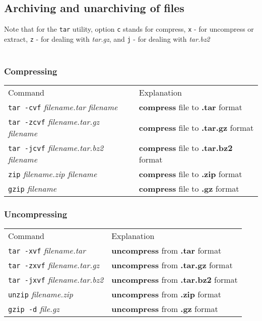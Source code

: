 \subsection{Archiving and unarchiving of files}
Note that for the \texttt{tar} utility, option \texttt{c} stands for compress, 
\texttt{x} - for uncompress or extract, \texttt{z} - for dealing with \textit{tar.gz},
and \texttt{j} - for dealing with \textit{tar.bz2}\\~\\
\subsubsection{Compressing}
\begin{tabular}{ll}
  Command & Explanation \\
  \hhline{==}
  \texttt{tar -cvf} \textit{filename.tar} \textit{filename} & \textbf{compress} file to \textbf{.tar} format \\
  \texttt{tar -zcvf} \textit{filename.tar.gz} \textit{filename} & \textbf{compress} file to \textbf{.tar.gz} format \\
  \texttt{tar -jcvf} \textit{filename.tar.bz2} \textit{filename} & \textbf{compress} file to \textbf{.tar.bz2} format \\
  \texttt{zip} \textit{filename.zip filename} & \textbf{compress} file to \textbf{.zip} format \\
  \texttt{gzip} \textit{filename} & \textbf{compress} file to \textbf{.gz} format \\
\end{tabular}

\subsubsection{Uncompressing}
\begin{tabular}{ll}
  Command & Explanation \\
  \hhline{==}
  \texttt{tar -xvf} \textit{filename.tar} & \textbf{uncompress} from \textbf{.tar} format \\
  \texttt{tar -zxvf} \textit{filename.tar.gz} & \textbf{uncompress} from \textbf{.tar.gz} format \\
  \texttt{tar -jxvf} \textit{filename.tar.bz2} & \textbf{uncompress} from \textbf{.tar.bz2} format \\
  \texttt{unzip} \textit{filename.zip} & \textbf{uncompress} from \textbf{.zip} format \\
  \texttt{gzip -d} \textit{file.gz} & \textbf{uncompress} from \textbf{.gz} format \\
\end{tabular}

